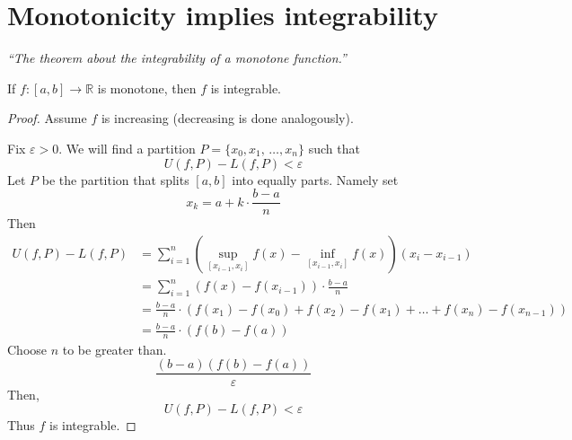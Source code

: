 \documentclass[12pt]{report}
\begin{document}
    \section{Monotonicity implies integrability}
    \textit{``The theorem about the integrability of a monotone function.''} \vspace{3mm}
    \begin{theorem}
        If \(f:[a,b] \to \mathbb{R}\) is monotone, then \(f\) is integrable.
    \end{theorem}
    \begin{proof}
        Assume \(f\) is increasing (decreasing is done analogously).

        Fix \(\varepsilon > 0\). We will find a partition \(P = \{x_0, x_1, \, \dots, x_n\}\) such that 
        \[U(f,P) - L(f,P) < \varepsilon\]
        Let \(P\) be the partition that splits \([a,b]\) into equally parts. Namely set
        \[x_k = a + k \cdot \frac{b-a}{n}\]
        Then
        \begin{align*}
            U(f,P) - L(f,P) &= \sum^n _{i=1} \left( \underset{[x_{i-1}, x_i]}{\sup} f(x) - \underset{[x_{i-1}, x_i]}{\inf} f(x)\right) \left(x_i - x_{i-1}\right)\\
            &= \sum^n_{i=1} \left(f(x) - f(x_{i-1})\right) \cdot \frac{b-a}{n}\\
            &= \frac{b-a}{n} \cdot \left(f(x_1) - f(x_0) + f(x_2) - f(x_1)+ \dots + f(x_n) - f(x_{n-1})\right)\\
            &= \frac{b-a}{n} \cdot \left(f(b) - f(a)\right)
        \end{align*}
        Choose \(n\) to be greater than.
        \[\frac{(b-a)(f(b) - f(a))}{\varepsilon}\]
        Then,
        \[U(f,P) - L(f,P) < \varepsilon\]
        Thus \(f\) is integrable.
    \end{proof}
\end{document}
